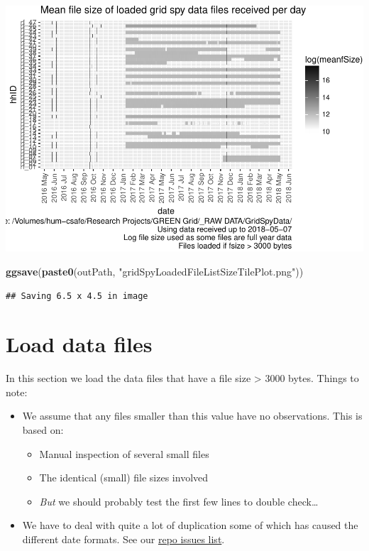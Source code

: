 \documentclass[]{article}
\newenvironment{Shaded}{\begin{snugshade}}{\end{snugshade}}
\newcommand{\KeywordTok}[1]{\textcolor[rgb]{0.13,0.29,0.53}{\textbf{#1}}}
\newcommand{\StringTok}[1]{\textcolor[rgb]{0.31,0.60,0.02}{#1}}
\newcommand{\NormalTok}[1]{#1}
\providecommand{\tightlist}{%
  \setlength{\itemsep}{0pt}\setlength{\parskip}{0pt}}
\begin{document}
\includegraphics{processNZGGElecCons1minData_files/figure-latex/loadedFileSizesPlot-1.pdf}

\begin{Shaded}
\begin{Highlighting}[]
\KeywordTok{ggsave}\NormalTok{(}\KeywordTok{paste0}\NormalTok{(outPath, }\StringTok{"gridSpyLoadedFileListSizeTilePlot.png"}\NormalTok{))}
\end{Highlighting}
\end{Shaded}

\begin{verbatim}
## Saving 6.5 x 4.5 in image
\end{verbatim}

\section{Load data files}\label{load-data-files}

In this section we load the data files that have a file size
\textgreater{} 3000 bytes. Things to note:

\begin{itemize}
\tightlist
\item
  We assume that any files smaller than this value have no observations.
  This is based on:

  \begin{itemize}
  \tightlist
  \item
    Manual inspection of several small files
  \item
    The identical (small) file sizes involved
  \item
    \emph{But} we should probably test the first few lines to double
    check\ldots{}
  \end{itemize}
\item
  We have to deal with quite a lot of duplication some of which has
  caused the different date formats. See our
  \href{https://git.soton.ac.uk/ba1e12/nzGREENGrid/issues?scope=all\&utf8=\%E2\%9C\%93\&state=all}{repo
  issues list}.
\end{itemize}
\end{document}
